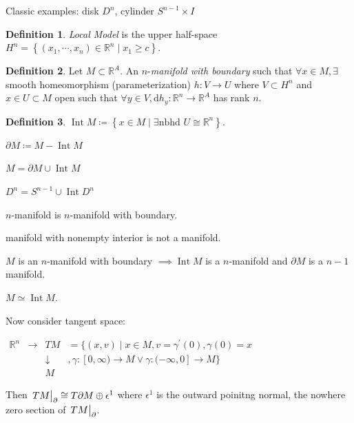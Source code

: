 \documentclass{article}
\theoremstyle{definition}
\newtheorem*{definition}{Definition}
\begin{document}
    Classic examples: disk \(D^n\), cylinder \(S^{n-1} \times I\)

    \begin{definition}
        \textit{Local Model} is the upper half-space \(H^n = \left\{ (x_1, \cdots , x_n) \in \mathbb{R}^n \mid x_1 \geq c \right\} \).
    \end{definition}

    \begin{definition}
        Let \(M \subset \mathbb{R}^A\). An \(n\)-\textit{manifold with boundary} such that \(\forall x\in M, \exists\) smooth homeomorphism (parameterization) \(h: V \to U\) where \(V \subset H^n\) and \(x \in U \subset M\) open such that \(\forall y\in V, \mathrm{d}h_y:\mathbb{R}^n \to \mathbb{R}^A\) has rank \(n\).
    \end{definition}

    \begin{definition}
        \(\operatorname{Int} M \coloneqq \left\{ x\in M \mid \exists \text{nbhd } U \cong \mathbb{R}^n \right\} \).
        
        \(\partial M \coloneqq M - \operatorname{Int} M\)

        \(M = \partial M \cup \operatorname{Int} M\) 
        
        \(D^n = S^{n-1} \cup \operatorname{Int} D^n\)
    \end{definition}

    \(n\)-manifold is \(n\)-manifold with boundary.

    manifold with nonempty interior is not a manifold.

    \(M\) is an \(n\)-manifold with boundary \(\implies \operatorname{Int} M\) is a \(n\)-manifold and \(\partial M\) is a \(n-1\) manifold.

    \(M \simeq \operatorname{Int} M\).

    Now consider tangent space:

    \(\begin{matrix}
        \mathbb{R}^n & \rightarrow & TM & = \{ (x,v) \mid x\in M, v= \gamma^{\prime} (0), \gamma(0)=x  \\ & & \downarrow & , \gamma : [0,\infty) \to M \lor \gamma :(-\infty,0] \to M \} \\ & & M
    \end{matrix}\) 

    Then \(\eval{TM}_{\partial} \cong T \partial M \oplus \epsilon^1\) where \(\epsilon^1\) is the outward poinitng normal, the nowhere zero section of \(\eval{TM}_\partial \).
\end{document}
